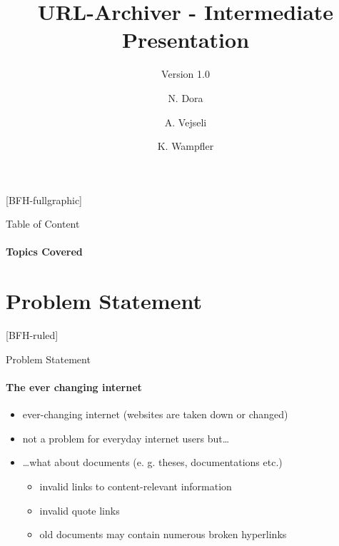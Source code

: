 \documentclass[
    ngerman,%
    authorontitle=true,
]{bfhbeamer}
\title{URL-Archiver - Intermediate Presentation}
\subtitle{Version 1.0}
\author[N. Dora \and A. Vejseli \and K. Wampfler]{N. Dora \and A. Vejseli \and K. Wampfler}
\institute{School of Engineering and Computer Science}
\begin{document}

    [BFH-fullgraphic]
    \maketitle



    \begin{frame}{Table of Content}
        \framesubtitle{Topics Covered}
        \tableofcontents
    \end{frame}



    \section{Problem Statement}
    [BFH-ruled]
    \frame{\sectionpage}

    \begin{frame}{Problem Statement}
        \framesubtitle{The ever changing internet}
        \begin{itemize}
            \item ever-changing internet (websites are taken down or changed)
            \item not a problem for everyday internet users but\ldots
            \item \ldots what about documents (e. g. theses, documentations etc.)
            \begin{itemize}
                \item invalid links to content-relevant information
                \item invalid quote links
                \item old documents may contain numerous broken hyperlinks
            \end{itemize}
        \end{itemize}
    \end{frame}
\end{document}
